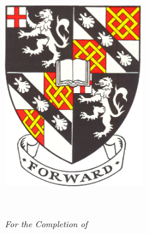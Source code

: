 \begin{titlepage}
	\begin{addmargin}[-1cm]{-3cm}
    \begin{center}
        \large

        \hfill

        \vfill

        \begingroup
            \color{RoyalPurple}\spacedallcaps{\myTitle} \\ \bigskip
        \endgroup

        \spacedlowsmallcaps{\myName}

        \vfill

        \includegraphics[width=6cm]{figures/Churchill_College_Crest_-_flat.png} \\ \medskip

        \mySubtitle \\ \bigskip

        \emph{For the Completion of}\\
        \myDegree \\ \bigskip

        \myDepartment \\
        \myUni \\ \bigskip

        \vfill

    \end{center}
  \end{addmargin}
\end{titlepage}
